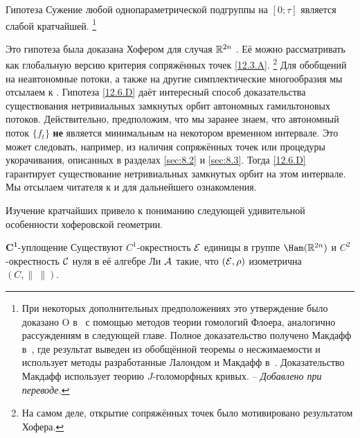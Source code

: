 \begin{thm}{Гипотеза}\label{12.6.D}
Сужение любой однопараметрической подгруппы на $[0;\tau]$ является
слабой кратчайшей.%
\footnote{
При некоторых дополнительных предположениях это утверждение было
доказано O в~\cite{O03} с помощью методов теории гомологий Флоера,
аналогично рассуждениям в следующей главе. Полное доказательство
получено Макдафф в~\cite[Proposition 1.5(i)]{McD01}, где результат выведен из обобщённой
теоремы о несжимаемости и использует методы разработанные Лалондом и
Макдафф в~\cite{LM95b}. Доказательство Макдафф использует теорию
$J$-голоморфных кривых. -- \textit{Добавлено при переводе.}}

\end{thm}

Это гипотеза была доказана Хофером для случая $\mathbb{R}^{2n}$ \cite{H2}. 
Её можно рассматривать как глобальную версию критерия сопряжённых точек \ref{12.3.A}.%
\footnote{На самом деле, открытие сопряжённых точек было мотивировано результатом Хофера.}  
Для обобщений на неавтономные потоки, а также на другие симплектические многообразия мы отсылаем к
\cite{BP1,
  Si1,LM2,Sch3,MSl}. 
Гипотеза \ref{12.6.D} даёт интересный способ доказательства
существования нетривиальных замкнутых орбит автономных гамильтоновых
потоков.  
Действительно, предположим, что мы заранее знаем, что автономный поток
$\{f_t\}$ \textbf{не} является минимальным на некотором временном
интервале. 
Это может следовать, например, из наличия сопряжённых точек или
процедуры укорачивания, описанных в разделах \ref{sec:8.2} и
\ref{sec:8.3}.  
Тогда \ref{12.6.D} гарантирует существование нетривиальных замкнутых
орбит на этом интервале.  
Мы отсылаем читателя к \cite{LM2} и \cite{P8} для
дальнейшего ознакомления.  

Изучение кратчайших привело к пониманию следующей удивительной
особенности хоферовской геометрии.

\begin{thm}[\cite{BP1}.]{$\bm{C^1}$-уплощение}
\label{12.6.E}
Существуют $C^1$-окрестность $\mathcal{E}$ единицы в группе $\Ham(\RR^{2n})$ и $C^2$-окрестность $\mathcal{C}$ нуля в её алгебре Ли $\mathcal{A}$ такие, что $(\mathcal{E},\rho)$ изометрична $(C, \|\ \|)$. 
\end{thm}

